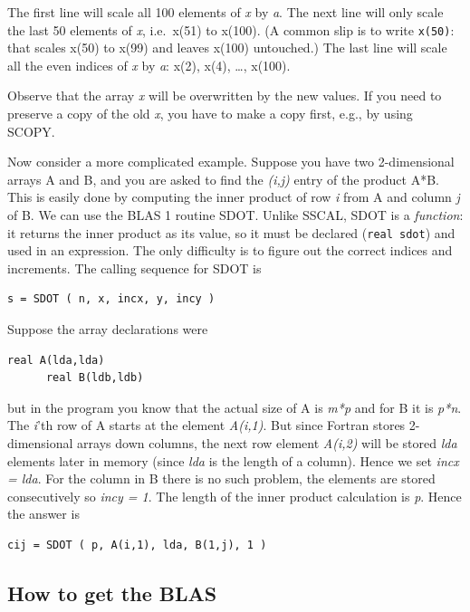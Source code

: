 The first line will scale all 100 elements of \emph{x} by \emph{a}. The next line will only scale the last 50 elements of \emph{x}, i.e.\ x(51) to x(100). (A common slip is to write \texttt{x(50)}: that scales x(50) to x(99) and leaves x(100) untouched.) The last line will scale all the even indices of \emph{x} by \emph{a}: x(2), x(4), \ldots, x(100).

Observe that the array \emph{x} will be overwritten by the new values. If you need to preserve a copy of the old \emph{x}, you have to make a copy first, e.g., by using SCOPY.

Now consider a more complicated example. Suppose you have two 2-dimensional arrays A and B, and you are asked to find the \emph{(i,j)} entry of the product A*B. This is easily done by computing the inner product of row \emph{i} from A and column \emph{j} of B. We can use the BLAS 1 routine SDOT. Unlike SSCAL, SDOT is a \emph{function}: it returns the inner product as its value, so it must be declared (\texttt{real sdot}) and used in an expression. The only difficulty is to figure out the correct indices and increments. The calling sequence for SDOT is

\begin{lstlisting}[style=fortran77]
      s = SDOT ( n, x, incx, y, incy )
\end{lstlisting}

Suppose the array declarations were

\begin{lstlisting}[style=fortran77]
      real A(lda,lda)
      real B(ldb,ldb)
\end{lstlisting}

but in the program you know that the actual size of A is \emph{m*p} and for B it is \emph{p*n}. The \emph{i}'th row of A starts at the element \emph{A(i,1)}. But since Fortran stores 2-dimensional arrays down columns, the next row element \emph{A(i,2)} will be stored \emph{lda} elements later in memory (since \emph{lda} is the length of a column). Hence we set \emph{incx = lda}. For the column in B there is no such problem, the elements are stored consecutively so \emph{incy = 1}. The length of the inner product calculation is \emph{p}. Hence the answer is

\begin{lstlisting}[style=fortran77]
      cij = SDOT ( p, A(i,1), lda, B(1,j), 1 )
\end{lstlisting}

\subsection{How to get the BLAS}

